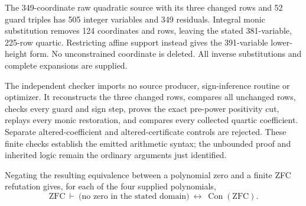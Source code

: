 The 349-coordinate raw quadratic source with its three changed rows and
52 guard triples has 505 integer variables and 349 residuals. Integral
monic substitution removes 124 coordinates and rows, leaving the stated
381-variable, 225-row quartic. Restricting affine support instead gives
the 391-variable lower-height form. No unconstrained coordinate is
deleted. All inverse substitutions and complete expansions are supplied.

The independent checker imports no source producer, sign-inference
routine or optimizer. It reconstructs the three changed rows, compares
all unchanged rows, checks every guard and sign step, proves the exact
pre-power positivity cut, replays every monic restoration, and compares
every collected quartic coefficient. Separate altered-coefficient and
altered-certificate controls are rejected. These finite checks establish
the emitted arithmetic syntax; the unbounded proof and inherited logic
remain the ordinary arguments just identified.

Negating the resulting equivalence between a polynomial zero and a
finite ZFC refutation gives, for each of the four supplied polynomials,
\[
 \mathrm{ZFC}\ \vdash\
 \bigl(\text{no zero in the stated domain}\bigr)
 \ \longleftrightarrow\ \operatorname{Con}(\mathrm{ZFC}).
\]
